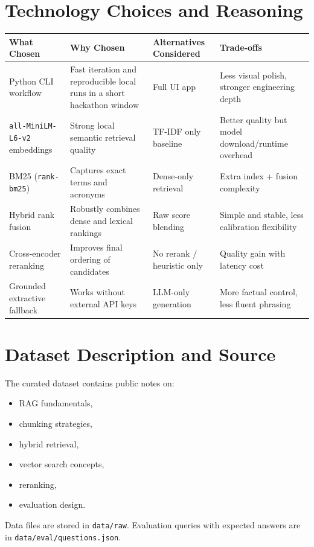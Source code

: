 \documentclass[11pt,a4paper]{article}
\begin{document}
\section{Technology Choices and Reasoning}
\begin{longtable}{p{}p{}p{}p{}}
\toprule
\textbf{What Chosen} & \textbf{Why Chosen} & \textbf{Alternatives Considered} & \textbf{Trade-offs} \\
\midrule
Python CLI workflow & Fast iteration and reproducible local runs in a short hackathon window & Full UI app & Less visual polish, stronger engineering depth \\
\texttt{all-MiniLM-L6-v2} embeddings & Strong local semantic retrieval quality & TF-IDF only baseline & Better quality but model download/runtime overhead \\
BM25 (\texttt{rank-bm25}) & Captures exact terms and acronyms & Dense-only retrieval & Extra index + fusion complexity \\
Hybrid rank fusion & Robustly combines dense and lexical rankings & Raw score blending & Simple and stable, less calibration flexibility \\
Cross-encoder reranking & Improves final ordering of candidates & No rerank / heuristic only & Quality gain with latency cost \\
Grounded extractive fallback & Works without external API keys & LLM-only generation & More factual control, less fluent phrasing \\
\bottomrule
\end{longtable}

\section{Dataset Description and Source}
The curated dataset contains public notes on:
\begin{itemize}
  \item RAG fundamentals,
  \item chunking strategies,
  \item hybrid retrieval,
  \item vector search concepts,
  \item reranking,
  \item evaluation design.
\end{itemize}
Data files are stored in \texttt{data/raw}. Evaluation queries with expected answers are in \texttt{data/eval/questions.json}.
\end{document}
